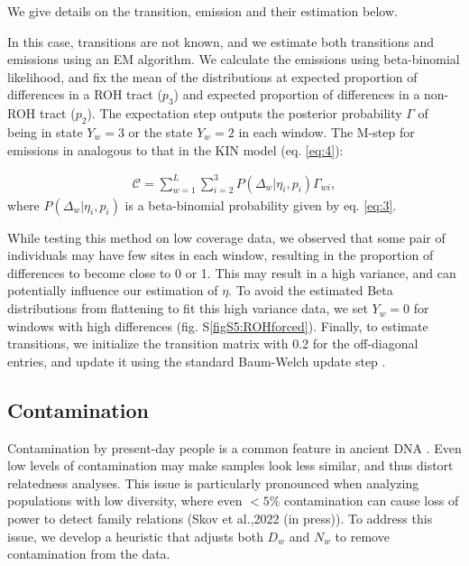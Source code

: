 \documentclass[12pt, letterpaper]{article}
\begin{document}
We give details on the transition, emission and their estimation below.

In this case, transitions are not known, and we estimate both transitions and emissions using an EM algorithm. We calculate the emissions using beta-binomial likelihood, and fix the mean of the distributions at expected proportion of differences in a ROH tract ($p_3$) and expected proportion of differences in a non-ROH tract ($p_2$). The expectation step outputs the posterior probability $\Gamma$ of being in state $Y_w=3$ or the state $Y_w=2$ in each window. The M-step for emissions in analogous to that in the KIN model (eq. \ref{eq:4}):

\begin{align}\label{eq:11}
\mathcal{C} = \sum_{w=1}^L \sum_{i=2}^3 P(\Delta_w|\eta_{i},p_{i}) \Gamma_{wi} ,
\end{align}
where $P(\Delta_w|\eta_{i},p_{i})$ is a beta-binomial probability given by eq. \ref{eq:3}.

While testing this method on low coverage data, we observed that some pair of individuals may have few sites in each window, resulting in the proportion of differences to become close to 0 or 1. This may result in a high variance, and can potentially influence our estimation of $\eta$. To avoid the estimated Beta distributions from flattening to fit this high variance data, we set $Y_w=0$ for windows with high differences (fig. S\ref{figS5:ROHforced}). Finally, to estimate transitions, we initialize the transition matrix with 0.2 for the off-diagonal entries, and update it using the standard Baum-Welch update step \cite{baum_maximization_1970}. 

\subsection{Contamination}
Contamination by present-day people is a common feature in ancient DNA \cite{peyregne_present-day_2020}. Even low levels of contamination may make samples look less similar, and thus distort relatedness analyses. This issue is particularly pronounced  when analyzing populations with low diversity, where even $<5\%$ contamination can cause loss of power to detect family relations (Skov et al.,2022 (in press)). To address this issue, we develop a heuristic that adjusts both $D_w$ and $N_w$ to remove contamination from the data.
\end{document}
